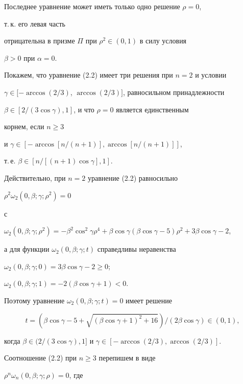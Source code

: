Последнее уравнение может иметь только одно решение $\rho=0$,


т.\,к. его левая часть


отрицательна в призме $\Pi$ при $\rho^2\in(0,1)$ в силу условия


$\beta>0$ при $\alpha=0$.





Покажем, что уравнение (2.2) имеет три решения при $n=2$ и условии


$\gamma\in[-\arccos(2/3)$, $\arccos(2/3)]$, равносильном принадлежности




$\beta\in[2/(3\cos\gamma),1]$, и что $\rho=0$ является единственным


корнем, если $n\ge 3$


и $\gamma\in [-\arccos[ n/(n+1)],\arccos [n/(n+1)]]$,


т.\,е. $\beta\in [ n/[(n+1)\cos\gamma],1]$.





Действительно, при $n=2$ уравнение (2.2) равносильно


$\rho^2\omega_2(0,\beta;\gamma;\rho^2)=0$


с


$\omega_2(0,\beta;\gamma;\rho^2)=-\beta^2\cos^2\gamma\rho^4


+\beta\cos\gamma(\beta\cos\gamma-5)\rho^2+3\beta\cos\gamma-2$,


а для функции $\omega_2(0,\beta;\gamma;t)$ справедливы неравенства


$\omega_2(0,\beta;\gamma;0)=3\beta\cos\gamma-2\ge 0$;


$\omega_2(0,\beta;\gamma;1)=-2(\beta\cos\gamma+1)<0$.


Поэтому уравнение $\omega_2(0,\beta;\gamma;t)=0$ имеет решение


$$


t=(\beta\cos\gamma-5+\sqrt{(\beta\cos\gamma+1)^2+16})/


(2\beta\cos\gamma)\in(0,1),


$$


когда $\beta\in(2/(3\cos\gamma),1]$ и $\gamma\in[-\arccos(2/3),


\arccos(2/3)]$.





Соотношение (2.2) при $n\ge 3$ перепишем в виде


$\rho^n\omega_n(0,\beta;\gamma;\rho)=0$, где


